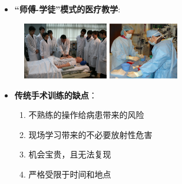\begin{frame}
\begin{itemize}
  \item \textbf{“师傅-学徒”模式的医疗教学}: 
\end{itemize}
\begin{figure}
\centering
\includegraphics[height=70pt]{../../Figures/background/clinical_training_center.eps}
\quad
\includegraphics[height=70pt]{../../Figures/background/cath_lab.eps}
\end{figure}

\begin{itemize}
  \item \textbf{传统手术训练的缺点}：
  \begin{enumerate}
     \item 不熟练的操作给病患带来的风险
     \item 现场学习带来的不必要放射性危害
     \item 机会宝贵，且无法复现
     \item 严格受限于时间和地点
  \end{enumerate}
\end{itemize}
\end{frame}

